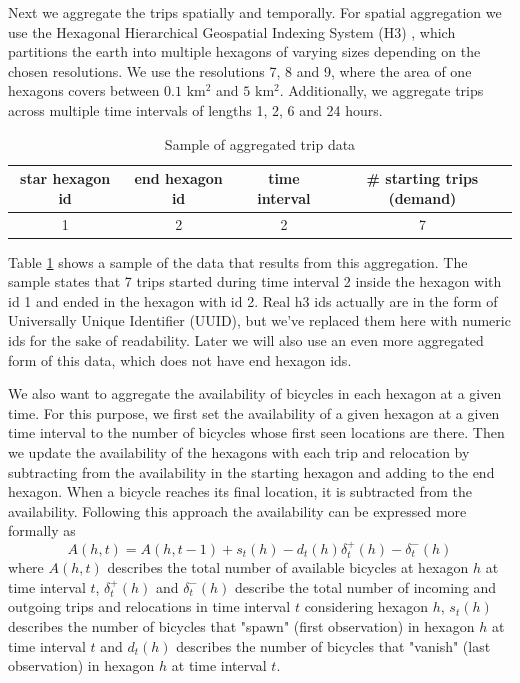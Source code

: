 Next we aggregate the trips spatially and temporally.
For spatial aggregation we use the Hexagonal Hierarchical Geospatial Indexing System (H3) , which partitions the earth into multiple hexagons of varying sizes depending on the chosen resolutions.
We use the resolutions 7, 8 and 9, where the area of one hexagons covers between \(0.1\) km\(^2\) and \(5\) km\(^2\).
Additionally, we aggregate trips across multiple time intervals of lengths 1, 2, 6 and 24 hours.


\begin{table}[h!]
    \centering
    \begin{tabular}{ c|c|c|c }
        star hexagon id & end hexagon id & time interval & \# starting trips (demand) \\
        \hline
        1               & 2              & 2             & 7                          \\
    \end{tabular}
    \caption{Sample of aggregated trip data}
    \label{table:aggregated_trips}
\end{table}

Table \ref{table:aggregated_trips} shows a sample of the data that results from this aggregation.
The sample states that 7 trips started during time interval 2 inside the hexagon with id 1 and ended in the hexagon with id 2.
Real h3 ids actually are in the form of Universally Unique Identifier (UUID), but we've replaced them here with numeric ids for the sake of readability.
Later we will also use an even more aggregated form of this data, which does not have end hexagon ids.



We also want to aggregate the availability of bicycles in each hexagon at a given time.
For this purpose, we first set the availability of a given hexagon at a given time interval to the number of bicycles whose first seen locations are there.
Then we update the availability of the hexagons with each trip and relocation by subtracting from the availability in the starting hexagon and adding to the end hexagon.
When a bicycle reaches its final location, it is subtracted from the availability.
Following this approach the availability can be expressed more formally as
\[A(h, t) = A(h, t-1) + s_t(h) - d_t(h) \delta_t^+(h) - \delta_t^-(h)\]
where \(A(h, t)\) describes the total number of available bicycles at hexagon \(h\) at time interval \(t\),
\(\delta_t^+(h)\) and \(\delta_t^-(h)\) describe the total number of incoming and outgoing trips and relocations in time interval \(t\) considering hexagon \(h\),
\(s_t(h)\) describes the number of bicycles that "spawn" (first observation) in hexagon \(h\) at time interval \(t\) and
\(d_t(h)\) describes the number of bicycles that "vanish" (last observation) in hexagon \(h\) at time interval \(t\).



